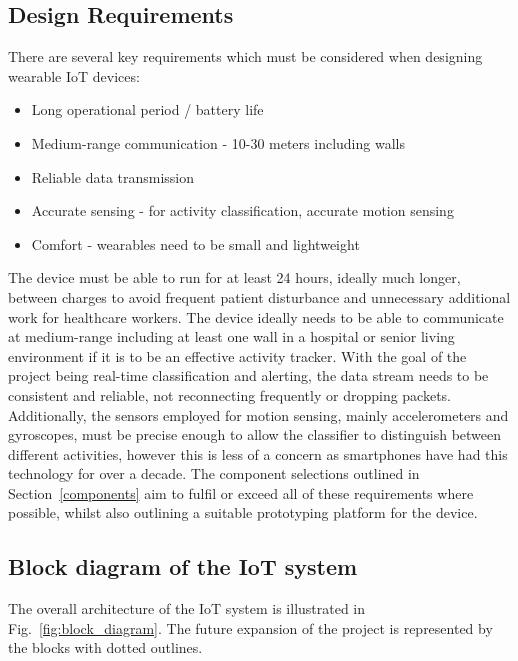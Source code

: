 \documentclass[conference]{IEEEtran}
\begin{document}
\subsection{Design Requirements}
There are several key requirements which must be considered when designing wearable IoT devices:
\begin{itemize}
	\item Long operational period / battery life
	\item Medium-range communication - 10-30 meters including walls
	\item Reliable data transmission
	\item Accurate sensing - for activity classification, accurate motion sensing
	\item Comfort - wearables need to be small and lightweight
\end{itemize}

The device must be able to run for at least 24 hours, ideally much longer, between charges to avoid frequent patient disturbance and unnecessary additional work for healthcare workers. The device ideally needs to be able to communicate at medium-range including at least one wall in a hospital or senior living environment if it is to be an effective activity tracker. With the goal of the project being real-time classification and alerting, the data stream needs to be consistent and reliable, not reconnecting frequently or dropping packets. Additionally, the sensors employed for motion sensing, mainly accelerometers and gyroscopes, must be precise enough to allow the classifier to distinguish between different activities, however this is less of a concern as smartphones have had this technology for over a decade. The component selections outlined in Section~\ref{components} aim to fulfil or exceed all of these requirements where possible, whilst also outlining a suitable prototyping platform for the device.

\subsection{Block diagram of the IoT system}
The overall architecture of the IoT system is illustrated in Fig.~\ref{fig:block_diagram}. The future expansion of the project is represented by the blocks with dotted outlines.
\end{document}
